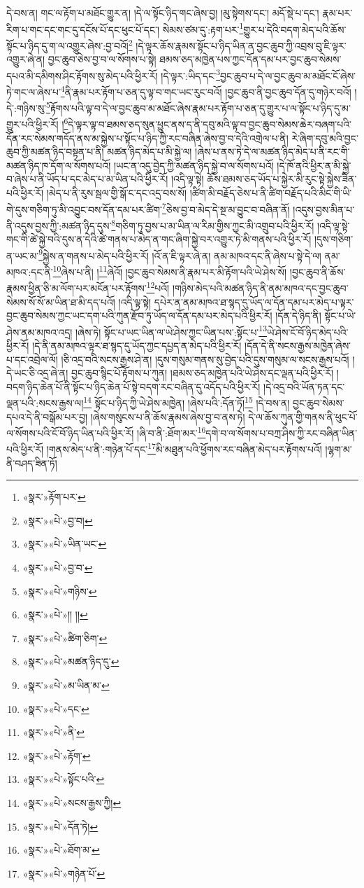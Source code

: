 དེ་བས་ན། གང་ལ་རྟོག་པ་མཐོང་གྱུར་ན། །དེ་ལ་སྟོང་ཉིད་གང་ཞེས་བྱ། །མུ་སྟེགས་དང་། མདོ་སྡེ་པ་དང་། རྣམ་པར་རིག་པ་གང་དང་གང་དུ་དངོས་པོ་དང་ཕུང་པོ་དང་། སེམས་ཙམ་དུ་:རྟག་པར་\footnote{«སྣར་»རྟོག་པར་}གྱུར་པ་དེའི་བདག་མེད་པའི་ཆོས་སྟོང་པ་ཉིད་དུ་ག་ལ་འགྱུར་ཞེས་:བྱ་བའོ།\footnote{«སྣར་»«པེ་»བྱ་བ།} །དེ་ལྟར་ཆོས་རྣམས་སྟོང་པ་ཉིད་ཡིན་ན་བྱང་ཆུབ་ཀྱི་འབྲས་བུ་ཇི་ལྟར་འགྱུར་ཞེ་ན། བྱང་ཆུབ་ཅེས་བྱ་བ་ལ་སོགས་པ་སྟེ། ཐམས་ཅད་མཁྱེན་པས་ཀྱང་དོན་དམ་པར་བྱང་ཆུབ་སེམས་དཔའ་མི་དམིགས་ཤིང་རྟོགས་སུ་མེད་པའི་ཕྱིར་རོ། །དེ་ལྟར་:ཡིད་དང་\footnote{«སྣར་»«པེ་»ཡིན་ཡང་}བྱང་ཆུབ་པ་དེ་ལ་བྱང་ཆུབ་མ་མཐོང་ངོ་ཞེས་ཏེ་གང་ལ་ཞེས་པ་\footnote{«སྣར་»«པེ་»བྱ་བ་}ནི་རྣམ་པར་རྟོག་པ་ཅན་དུ་ལྟ་བ་གང་ཡང་རུང་བའོ། །བྱང་ཆུབ་ནི་བྱང་ཆུབ་དོན་དུ་གཉེར་བའོ། །དེ་:གཉིས་སུ་\footnote{«སྣར་»«པེ་»གཉིས་}རྟོགས་པའི་ལྟ་བ་དེ་ལ་བྱང་ཆུབ་མ་མཐོང་ཞེས་རྣམ་པར་རྟོག་པ་ཅན་དུ་གྱུར་པ་ལ་སྟོང་པ་ཉིད་དུ་མ་གྱུར་པའི་ཕྱིར་རོ། །\footnote{«སྣར་»«པེ་»།། །།}དེ་ལྟར་ལྟ་བ་ཐམས་ཅད་སུན་ཕྱུང་ནས་ད་ནི་དབུ་མའི་ལྟ་བ་བྱང་ཆུབ་སེམས་ཆེར་བཞག་པའི་དོན་རང་སེམས་གདོད་ནས་མ་སྐྱེས་པ་སྟོང་པ་ཉིད་ཀྱི་རང་བཞིན་ཞེས་བྱ་བ་དེའི་འགྲེལ་པ་ནི། རེ་ཞིག་དབུ་མའི་བྱང་ཆུབ་ཀྱི་མཚན་ཉིད་བསྟན་པ་ནི། མཚན་ཉིད་མེད་པ་མི་སྐྱེ་ལ། །ཞེས་པ་ནས་ཏེ་དེ་ལ་མཚན་ཉིད་མེད་པ་ནི་རང་གི་མཚན་ཉིད་ཁ་དོག་ལ་སོགས་པའོ། །ཡང་ན་འདུ་བྱེད་ཀྱི་མཚན་ཉིད་སྐྱེ་བ་ལ་སོགས་པའོ། །དེ་ཁོ་ནའི་ཕྱིར་ན་མི་སྐྱེ་བ་ཞེས་པ་ནི་ཡོད་པ་དང་མེད་པ་མ་ཡིན་པའི་ཕྱིར་རོ། །འདི་ལྟ་སྟེ། ཆོས་ཐམས་ཅད་ཡོད་པ་སྐྱེར་མི་རུང་སྟེ་སྐྱེས་ཟིན་པའི་ཕྱིར་རོ། །མེད་པ་ནི་རུས་སྦལ་གྱི་སྒོ་ང་དང་འདྲ་བས་སོ། །ཚིག་མི་བརྗོད་ཅེས་པ་ནི་ཚིག་བརྗོད་པའི་མིང་གི་ཡི་གེ་དུས་གཅིག་ཏུ་མི་འབྱུང་བས་དོན་དམ་པར་ཚིག་\footnote{«སྣར་»«པེ་»ཚིག་ཅིག་}ཅེས་བྱ་བ་མེད་དེ་སྔ་མ་བྱུང་བ་བཞིན་ནོ། །འདུས་བྱས་མིན་པ་ནི་འདུས་བྱས་ཀྱི་:མཚན་ཉིད་དུས་\footnote{«སྣར་»«པེ་»མཚན་ཉིད་དུ་}གཅིག་ཏུ་བྱས་པ་མ་ཡིན་ལ་རིམ་གྱིས་ཀྱང་མི་འགྲུབ་པའི་ཕྱིར་རོ། །འདི་ལྟ་སྟེ་གང་གི་ཚེ་སྐྱེ་བའི་དུས་ན་དེའི་ཚེ་གནས་པ་མེད་ན་གང་ཞིག་སྐྱེ་བར་འགྱུར་ཏེ་མི་གནས་པའི་ཕྱིར་རོ། །དུས་གཅིག་ན་ཡང་མ་\footnote{«སྣར་»«པེ་»མ་ཡིན་མ་}སྐྱེས་ན་གནས་པ་མེད་པའི་ཕྱིར་རོ། །འོ་ན་ཇི་ལྟར་ཞེ་ན། ནམ་མཁའ་དང་ནི་ཞེས་པ་སྟེ་དེ་ལ། ནམ་མཁའ་:དང་ནི་\footnote{«སྣར་»«པེ་»དང་}ཞེས་པ་ནི། །\footnote{«སྣར་»«པེ་»ནི་}ཞེའོ། །བྱང་ཆུབ་སེམས་ནི་རྣམ་པར་མི་རྟོག་པའི་ཡེ་ཤེས་སོ། །བྱང་ཆུབ་ནི་ཆོས་རྣམས་ཕྱིན་ཅི་མ་ལོག་པར་མངོན་པར་རྟོགས་\footnote{«སྣར་»«པེ་»རྟོག་}པའོ། །གཉིས་མེད་པའི་མཚན་ཉིད་ནི་ནམ་མཁའ་དང་བྱང་ཆུབ་སེམས་སོ་སོ་མ་ཡིན་ཐ་མི་དད་པའོ། །འདི་ལྟ་སྟེ། དཔེར་ན་ནམ་མཁའ་ཐ་སྙད་དུ་ཡོད་ལ་དོན་དམ་པར་མེད་པ་ལྟར་བྱང་ཆུབ་སེམས་ཀྱང་ཡང་དག་པའི་ཀུན་རྫོབ་ཏུ་ཡོད་ལ་དོན་དམ་པར་མེད་པའི་ཕྱིར་རོ། །དོན་དེ་ཉིད་ནི། སྟོང་པ་ཡེ་ཤེས་ནམ་མཁའ་འདྲ། །ཞེས་ཏེ། སྟོང་པ་ཡང་ཡིན་ལ་ཡེ་ཤེས་ཀྱང་ཡིན་པས་:སྟོང་པ་\footnote{«སྣར་»«པེ་»སྟོང་པའི་}ཡེ་ཤེས་ངོ་བོ་ཉིད་མེད་པའི་ཕྱིར་རོ། །དེ་ནི་ནམ་མཁའ་ལྟར་ཐ་སྙད་དུ་ཡོད་ཀྱང་དཔྱད་ན་མེད་པའི་ཕྱིར་རོ། །དོན་དེ་ནི་སངས་རྒྱས་མཁྱེན་ཞེས་པ་དང་འབྲེལ་ལོ། །ཅི་འདྲ་བའི་སངས་རྒྱས་ཤེ་ན། །དུས་གསུམ་གནས་སུ་བྱེད་པའི་དུས་གསུམ་ལ་སངས་རྒྱས་པའོ། །དེ་ཡང་ཅི་འདྲ་ཞེ་ན། བྱང་ཆུབ་སྙིང་པོ་རྟོགས་པ་ཀུན། །ཐམས་ཅད་མཁྱེན་པའི་ཡེ་ཤེས་དང་ལྡན་པའི་ཕྱིར་རོ། །བདག་ཉིད་ཆེན་པོ་ནི་སྟོང་པ་ཉིད་ཆེན་པོ་སྟེ་བདག་རང་བཞིན་དུ་འདོད་པའི་ཕྱིར་རོ། །དེ་འདྲ་བའི་ཡོན་ཏན་དང་ལྡན་པའི་:སངས་རྒྱས་ལ།\footnote{«སྣར་»«པེ་»སངས་རྒྱས་ཀྱི།} སྟོང་པ་ཉིད་ཀྱི་ཡེ་ཤེས་མཁྱེན། །ཞེས་པའི་:དོན་ཏོ།\footnote{«སྣར་»«པེ་»དོན་ཏེ།} །དེ་བས་ན། བྱང་ཆུབ་སེམས་དཔའ་དེ་ནི་བསྒོམ་པར་བྱ། །ཞེས་གསུངས་པ་ནི་ཆོས་རྣམས་ཞེས་བྱ་བ་ནས་ཏེ། དེ་ལ་ཆོས་ཀུན་གྱི་གནས་ནི་ཕུང་པོ་ལ་སོགས་པའི་ངོ་བོ་ཉིད་ཡིན་པའི་ཕྱིར་རོ། །ཞི་བ་ནི་:ཐོག་མར་\footnote{«སྣར་»«པེ་»ཐོག་མ་}དགེ་བ་ལ་སོགས་པ་བཀྲ་ཤིས་ཀྱི་རང་བཞིན་ཡིན་པའི་ཕྱིར་རོ། །གནས་མེད་པ་ནི་:གཉེན་པོ་དང་\footnote{«སྣར་»«པེ་»གཉེན་པོ་}མི་མཐུན་པའི་ཕྱོགས་རང་བཞིན་མེད་པར་རྟོགས་པའོ། །ལྷག་མ་ནི་བཤད་ཟིན་ཏོ། 